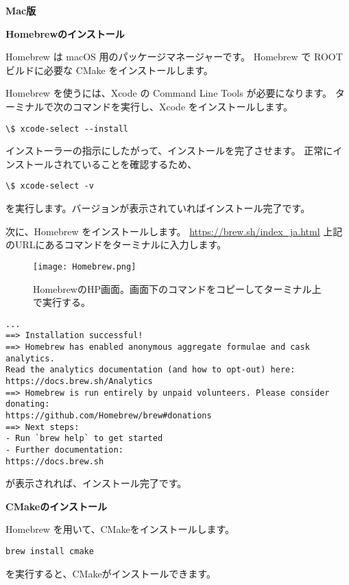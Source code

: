 \documentclass[10pt,a4j]{jarticle}
\begin{document}
\vspace{0.5cm}

\vspace{1cm}
{\large \bf Mac版}
\normalsize{}

\vspace{0.5cm}
{\bf Homebrewのインストール}
\vspace{0.3cm}

Homebrew は macOS 用のパッケージマネージャーです。
Homebrew で ROOT ビルドに必要な CMake をインストールします。\par
Homebrew を使うには、Xcode の Command Line Tools が必要になります。
ターミナルで次のコマンドを実行し、Xcode をインストールします。
\begin{lstlisting}
\$ xcode-select --install
\end{lstlisting}
インストーラーの指示にしたがって、インストールを完了させます。
正常にインストールされていることを確認するため、
\begin{lstlisting}
\$ xcode-select -v
\end{lstlisting}
を実行します。バージョンが表示されていればインストール完了です。\par
次に、Homebrew をインストールします。
\url{https://brew.sh/index_ja.html}
上記のURLにあるコマンドをターミナルに入力します。
\begin{figure}[h]
\begin{center}
\texttt{[image: Homebrew.png]}
\caption{HomebrewのHP画面。画面下のコマンドをコピーしてターミナル上で実行する。}
\end{center}
\end{figure}
\begin{lstlisting}[caption=Homebrewインストール時のスクリプト]
...
==> Installation successful!
==> Homebrew has enabled anonymous aggregate formulae and cask analytics.
Read the analytics documentation (and how to opt-out) here:
https://docs.brew.sh/Analytics
==> Homebrew is run entirely by unpaid volunteers. Please consider donating:
https://github.com/Homebrew/brew#donations
==> Next steps:
- Run `brew help` to get started
- Further documentation:
https://docs.brew.sh
\end{lstlisting}

が表示されれば、インストール完了です。\par

\vspace{0.5cm}
{\bf CMakeのインストール}
\vspace{0.3cm}

Homebrew を用いて、CMakeをインストールします。
\begin{lstlisting}
brew install cmake
\end{lstlisting}
を実行すると、CMakeがインストールできます。
\end{document}
